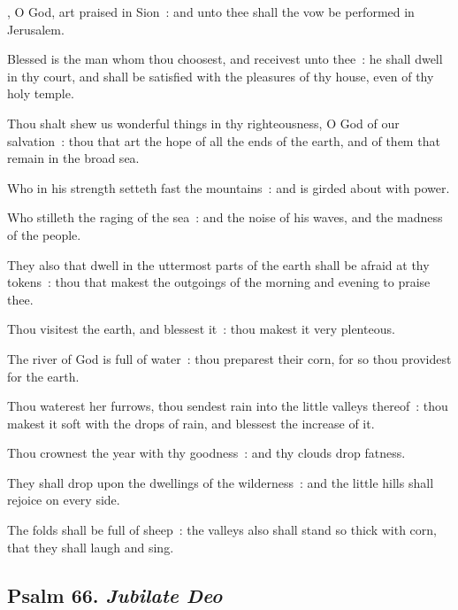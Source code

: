 , O God, art praised in Sion~: and unto thee shall the vow be performed in Jerusalem.\par
{}
Blessed is the man whom thou choosest, and receivest unto thee~: he shall dwell in thy court, and shall be satisfied with the pleasures of thy house, even of thy holy temple.\par
{}Thou shalt shew us wonderful things in thy righteousness, O God of our salvation~: thou that art the hope of all the ends of the earth, and of them that remain in the broad sea.\par
{}Who in his strength setteth fast the mountains~: and is girded about with power.\par
{}Who stilleth the raging of the sea~: and the noise of his waves, and the madness of the people.\par
{}They also that dwell in the uttermost parts of the earth shall be afraid at thy tokens~: thou that makest the outgoings of the morning and evening to praise thee.\par
{}Thou visitest the earth, and blessest it~: thou makest it very plenteous.\par
{}The river of God is full of water~: thou preparest their corn, for so thou providest for the earth.\par
{}Thou waterest her furrows, thou sendest rain into the little valleys thereof~: thou makest it soft with the drops of rain, and blessest the increase of it.\par
{}Thou crownest the year with thy goodness~: and thy clouds drop fatness.\par
{}They shall drop upon the dwellings of the wilderness~: and the little hills shall rejoice on every side.\par
{}The folds shall be full of sheep~: the valleys also shall stand so thick with corn, that they shall laugh and sing.\par

\subsection{Psalm 66. \textit{Jubilate Deo}}

